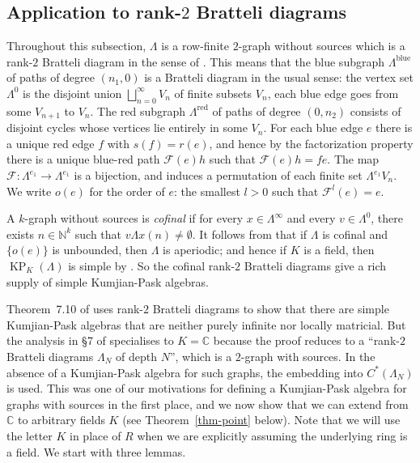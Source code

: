 \documentclass[a4paper,12pt]{amsart}
\numberwithin{equation}{section}
\theoremstyle{definition}
\theoremstyle{remark}
\begin{document}
\subsection{Application to rank-$2$ Bratteli diagrams} \label{sec_cofinal}  Throughout this subsection, 
$\Lambda$ is a row-finite $2$-graph without sources which is a rank-$2$ Bratteli diagram in the sense of \cite[Definition~4.1]{PRRS}. 
This means that the blue subgraph $\Lambda^{{\operatorname{\mathrm{blue}}}}$ of paths of degree $(n_1, 0)$ is a Bratteli diagram in the usual sense: the vertex set $\Lambda^0$ is the disjoint union $\bigsqcup_{n=0}^\infty V_n$ of finite subsets $V_n$, each blue edge goes from some $V_{n+1}$ to $V_n$. The red subgraph $\Lambda^{{\operatorname{\mathrm{red}}}}$ of paths of degree $(0,n_2)$ consists of disjoint cycles whose vertices lie entirely in some $V_n$. For each blue edge $e$ there is a unique red edge $f$ with $s(f)=r(e)$, and hence by the factorization property there is a unique blue-red path ${\mathcal{F}}(e)h$ such that ${\mathcal{F}}(e)h=fe$. The map ${\mathcal{F}}:\Lambda^{e_1}\to \Lambda^{e_1}$ is a bijection, and induces a permutation of each finite set $\Lambda^{e_1}V_n$. We write $o(e)$ for the order of $e$: the smallest $l>0$ such that ${\mathcal{F}}^l(e)=e$. 

\label{page-cofinal} A $k$-graph without sources is \emph{cofinal} if for every $x\in\Lambda^{\infty}$ and every $v\in \Lambda^0$, there exists $n\in{\mathbb{N}}^k$ such that $v\Lambda x(n)\neq \emptyset$.
It follows from \cite[Theorem~5.1]{PRRS} that if $\Lambda$ is cofinal and $\{o(e)\}$ is unbounded, then $\Lambda$ is aperiodic; and hence if $K$ is a field, then $\operatorname{KP}_K(\Lambda)$ is simple  by \cite[Corollary~7.8]{ACaHR}.  So the cofinal rank-$2$ Bratteli diagrams give a rich supply of simple Kumjian-Pask algebras.

Theorem~7.10 of \cite{ACaHR} uses rank-$2$ Bratteli diagrams to show that there are simple Kumjian-Pask algebras that are neither purely infinite nor locally matricial.  But the  analysis in \S7 of \cite{ACaHR} specialises to $K={\mathbb{C}}$ because  the proof reduces to  a ``rank-$2$ Bratteli diagrams $\Lambda_N$ of depth $N$'', which is a $2$-graph with sources. In the absence of a Kumjian-Pask algebra for such graphs, the embedding into $C^*(\Lambda_N)$ is used.  This was one of our motivations for defining a Kumjian-Pask algebra for graphs with sources in the first place, and we now show that we can extend  
\cite[Theorem~7.10]{ACaHR} from ${\mathbb{C}}$ to arbitrary fields $K$ (see Theorem~\ref{thm-point} below).  Note that
we will use the letter $K$ in place of $R$ when we are explicitly assuming the underlying ring is a field.  
We start with three lemmas.  
\end{document}
